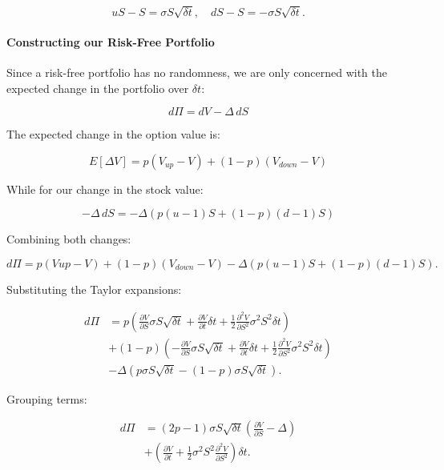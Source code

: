 \documentclass{article}
\begin{document}
\[
    uS - S = \sigma S \sqrt{\delta t}, \quad dS - S = -\sigma S \sqrt{\delta t}.
\]

\paragraph{Constructing our Risk-Free Portfolio}

Since a risk-free portfolio has no randomness, we are only concerned with the expected change in the portfolio over $\delta t$:

 \begin{equation*}
    \label{eq:delta_hedging_change_portfolio}
    d\Pi = dV - \Delta \, dS
 \end{equation*}


 The expected change in the option value is:

 \[
 E[\Delta V] = p(V_{up} - V) + (1 - p)(V_{down} - V)
 \]

 While for our change in the stock value:

 \[
    - \Delta \, dS = -\Delta \left( p(u - 1)S + (1 - p)(d - 1)S \right)
 \]


Combining both changes:

\[
    d\Pi = p (V{up} - V) + (1 - p)(V_{down} - V) - \Delta (p(u - 1)S + (1 - p)(d - 1)S).
\]

Substituting the Taylor expansions:

\begin{align*}
    d\Pi &= p \left( \frac{\partial V}{\partial S} \sigma S \sqrt{\delta t} + \frac{\partial V}{\partial t} \delta t + \frac{1}{2} \frac{\partial^2 V}{\partial S^2} \sigma^2 S^2 \delta t \right) \\
    &+ (1 - p) \left( -\frac{\partial V}{\partial S} \sigma S \sqrt{\delta t} + \frac{\partial V}{\partial t} \delta t + \frac{1}{2} \frac{\partial^2 V}{\partial S^2} \sigma^2 S^2 \delta t \right) \\
    &- \Delta \left( p \sigma S \sqrt{\delta t} - (1 - p) \sigma S \sqrt{\delta t} \right).
\end{align*}

Grouping terms:

\begin{align*}
    d\Pi &= (2p - 1) \sigma S \sqrt{\delta t} \left( \frac{\partial V}{\partial S} - \Delta \right) \\
    &+ \left( \frac{\partial V}{\partial t} + \frac{1}{2} \sigma^2 S^2 \frac{\partial^2 V}{\partial S^2} \right) \delta t.
\end{align*}
\end{document}
